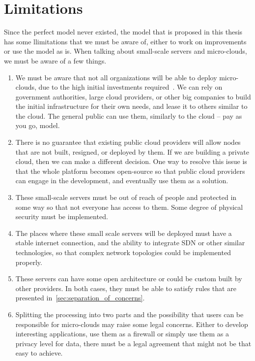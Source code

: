 \section{Limitations}\label{sec:limitations}
%
Since the perfect model never existed, the model that is proposed in this thesis has some llimitations that we must be aware of, either to work on improvements or use the model as is. When talking about small-scale servers and micro-clouds, we must be aware of a few things.

\begin{enumerate}[start=1,label={(\bfseries \arabic*)}]
	\item We must be aware that not all organizations will be able to deploy micro-clouds, due to the high initial investments required~\cite{MonsalveCC18}. We can rely on government authorities, large cloud providers, or other big companies to build the initial infrastructure for their own needs, and lease it to others similar to the cloud. The general public can use them, similarly to the cloud -- pay as you go, model.
	\item There is no guarantee that existing public cloud providers will allow nodes that are not built, resigned, or deployed by them. If we are building a private cloud, then  we can make a different decision. One way to resolve this issue is that the whole platform becomes open-source so that public cloud providers can engage in the development, and eventually use them as a solution.
	\item These small-scale servers must be out of reach of people and protected in some way so that not everyone has access to them. Some degree of physical security must be implemented.
	\item The places where these small scale servers will be deployed must have a stable internet connection, and the ability to integrate SDN or other similar technologies, so that complex network topologies could be implemented properly.
	\item These servers can have some open architecture or could be custom built by other providers. In both cases, they must be able to satisfy rules that are presented in~\ref{sec:separation_of_concerns}.
	\item Splitting the processing into two parts and the possibility that users can be responsible for micro-clouds may raise some legal concerns. Either to develop interesting applications, use them as a firewall or simply use them as a privacy level for data, there must be a legal agreement that might not be that easy to achieve.
\end{enumerate}
%
%